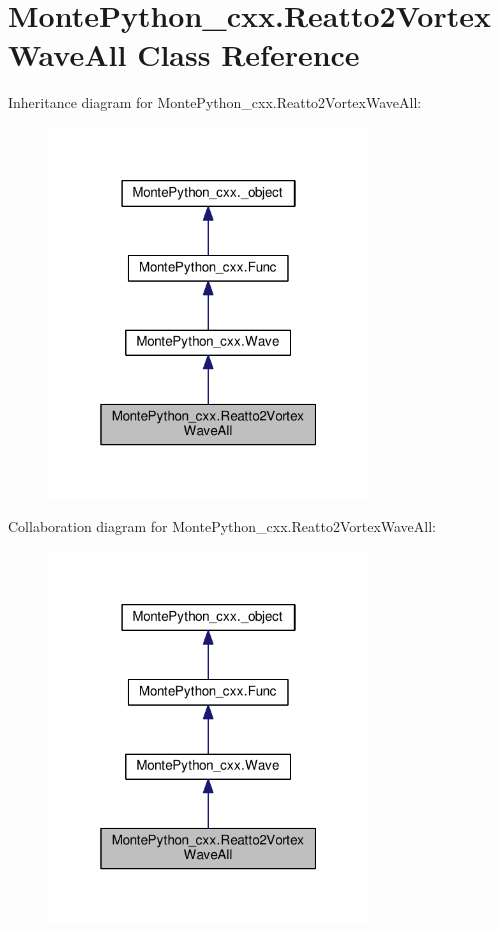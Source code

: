 \hypertarget{classMontePython__cxx_1_1Reatto2VortexWaveAll}{}\section{Monte\+Python\+\_\+cxx.\+Reatto2\+Vortex\+Wave\+All Class Reference}
\label{classMontePython__cxx_1_1Reatto2VortexWaveAll}


Inheritance diagram for Monte\+Python\+\_\+cxx.\+Reatto2\+Vortex\+Wave\+All\+:
\nopagebreak
\begin{figure}[H]
\begin{center}
\leavevmode
\includegraphics[width=241pt]{classMontePython__cxx_1_1Reatto2VortexWaveAll__inherit__graph}
\end{center}
\end{figure}


Collaboration diagram for Monte\+Python\+\_\+cxx.\+Reatto2\+Vortex\+Wave\+All\+:
\nopagebreak
\begin{figure}[H]
\begin{center}
\leavevmode
\includegraphics[width=241pt]{classMontePython__cxx_1_1Reatto2VortexWaveAll__coll__graph}
\end{center}
\end{figure}
